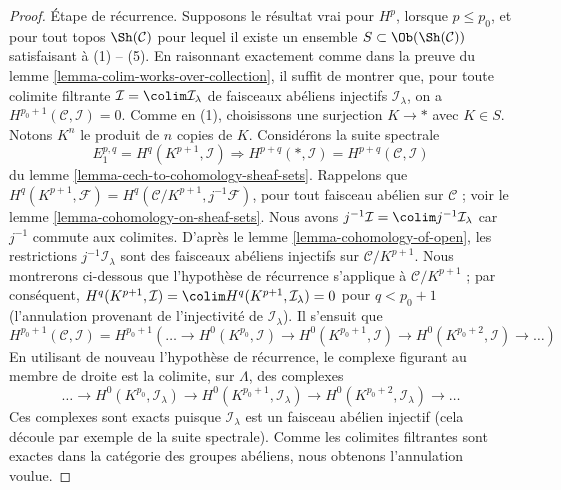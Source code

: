 \begin{proof}
\medskip\noindent
Étape de récurrence. Supposons le résultat vrai pour $H^p$, lorsque
$p \leq p_0$, et pour tout topos $\Sh(\mathcal{C})$ pour lequel il existe un
ensemble $S \subset \Ob(\Sh(\mathcal{C}))$ satisfaisant à (1) -- (5).
En raisonnant exactement comme dans la preuve du
lemme \ref{lemma-colim-works-over-collection}, il suffit de montrer que, pour
toute colimite filtrante $\mathcal{I} = \colim \mathcal{I}_\lambda$ de
faisceaux abéliens injectifs $\mathcal{I}_\lambda$, on a
$H^{p_0 + 1}(\mathcal{C}, \mathcal{I}) = 0$.
Comme en (1), choisissons une surjection $K \to *$ avec $K \in S$.
Notons $K^n$ le produit de $n$ copies de $K$.
Considérons la suite spectrale
$$
E_1^{p, q} = H^q(K^{p + 1}, \mathcal{I}) \Rightarrow
H^{p + q}(*, \mathcal{I}) = H^{p + q}(\mathcal{C}, \mathcal{I})
$$
du lemme \ref{lemma-cech-to-cohomology-sheaf-sets}. Rappelons que
$H^q(K^{p + 1}, \mathcal{F}) = H^q(\mathcal{C}/K^{p + 1}, j^{-1}\mathcal{F})$,
pour tout faisceau abélien sur $\mathcal{C}$ ; voir le
lemme \ref{lemma-cohomology-on-sheaf-sets}. Nous avons
$j^{-1}\mathcal{I} = \colim j^{-1}\mathcal{I}_\lambda$
car $j^{-1}$ commute aux colimites. D'après le
lemme \ref{lemma-cohomology-of-open}, les restrictions
$j^{-1}\mathcal{I}_\lambda$ sont des faisceaux abéliens injectifs sur
$\mathcal{C}/K^{p + 1}$. Nous montrerons ci-dessous que l'hypothèse de
récurrence s'applique à $\mathcal{C}/K^{p + 1}$ ; par conséquent,
$H^q(K^{p + 1}, \mathcal{I}) = \colim H^q(K^{p + 1}, \mathcal{I}_\lambda) = 0$
pour $q < p_0 + 1$ (l'annulation provenant de l'injectivité de
$\mathcal{I}_\lambda$). Il s'ensuit que
$$
H^{p_0 + 1}(\mathcal{C}, \mathcal{I}) =
H^{p_0 + 1}\left(\ldots \to
H^0(K^{p_0}, \mathcal{I}) \to
H^0(K^{p_0 + 1}, \mathcal{I}) \to
H^0(K^{p_0 + 2}, \mathcal{I}) \to \ldots\right)
$$
En utilisant de nouveau l'hypothèse de récurrence, le complexe figurant au
membre de droite est la colimite, sur $\Lambda$, des complexes
$$
\ldots \to
H^0(K^{p_0}, \mathcal{I}_\lambda) \to
H^0(K^{p_0 + 1}, \mathcal{I}_\lambda) \to
H^0(K^{p_0 + 2}, \mathcal{I}_\lambda) \to \ldots
$$
Ces complexes sont exacts puisque $\mathcal{I}_\lambda$ est un faisceau
abélien injectif (cela découle par exemple de la suite spectrale). Comme les
colimites filtrantes sont exactes dans la catégorie des groupes abéliens, nous
obtenons l'annulation voulue.


\end{proof}

